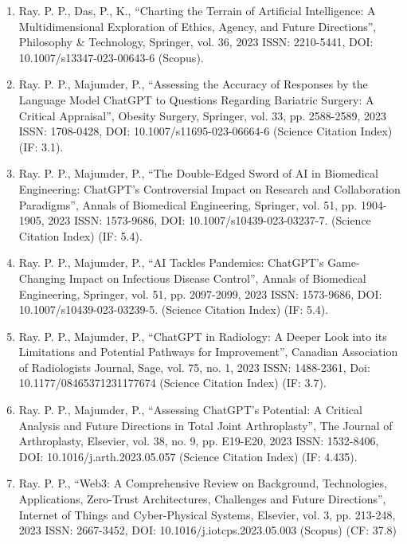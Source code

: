 \documentclass[11pt,a4paper]{moderncv}
\begin{document}
\begin{adjustwidth}{6em}{0pt}
\begin{enumerate}
		\item Ray. P. P., Das, P., K., “Charting the Terrain of Artificial Intelligence: A Multidimensional Exploration of Ethics, Agency, and Future Directions”, Philosophy \& Technology, Springer, vol. 36, 2023 ISSN: 2210-5441, DOI: 10.1007/s13347-023-00643-6 (Scopus). 
		
		\item Ray. P. P., Majumder, P., “Assessing the Accuracy of Responses by the Language Model ChatGPT to Questions Regarding Bariatric Surgery: A Critical Appraisal”, Obesity Surgery, Springer, vol. 33, pp. 2588-2589, 2023 ISSN: 1708-0428, DOI: 10.1007/s11695-023-06664-6 (Science Citation Index) (IF: 3.1). 
		
		\item Ray. P. P., Majumder, P., “The Double-Edged Sword of AI in Biomedical Engineering: ChatGPT's Controversial Impact on Research and Collaboration Paradigms”, Annals of Biomedical Engineering, Springer, vol. 51, pp. 1904-1905, 2023 ISSN: 1573-9686, DOI: 10.1007/s10439-023-03237-7. (Science Citation Index) (IF: 5.4). 
		
		\item Ray. P. P., Majumder, P., “AI Tackles Pandemics: ChatGPT's Game-Changing Impact on Infectious Disease Control”, Annals of Biomedical Engineering, Springer, vol. 51, pp. 2097-2099, 2023 ISSN: 1573-9686, DOI: 10.1007/s10439-023-03239-5. (Science Citation Index) (IF: 5.4).
		
		\item Ray. P. P., Majumder, P., “ChatGPT in Radiology: A Deeper Look into its Limitations and Potential Pathways for Improvement”, Canadian Association of Radiologists Journal, Sage, vol. 75, no. 1, 2023 ISSN: 1488-2361, Doi: 10.1177/08465371231177674 (Science Citation Index) (IF: 3.7). 
		
		\item Ray. P. P., Majumder, P., “Assessing ChatGPT's Potential: A Critical Analysis and Future Directions in Total Joint Arthroplasty”, The Journal of Arthroplasty, Elsevier, vol. 38, no. 9, pp. E19-E20, 2023 ISSN: 1532-8406, DOI: 10.1016/j.arth.2023.05.057 (Science Citation Index) (IF: 4.435). 
		
		\item Ray. P. P., “Web3: A Comprehensive Review on Background, Technologies, Applications, Zero-Trust Architectures, Challenges and Future Directions”, Internet of Things and Cyber-Physical Systems, Elsevier, vol. 3, pp. 213-248, 2023 ISSN: 2667-3452, DOI: 10.1016/j.iotcps.2023.05.003 (Scopus) (CF: 37.8)
		

\end{enumerate}
\end{adjustwidth}
\end{document}
